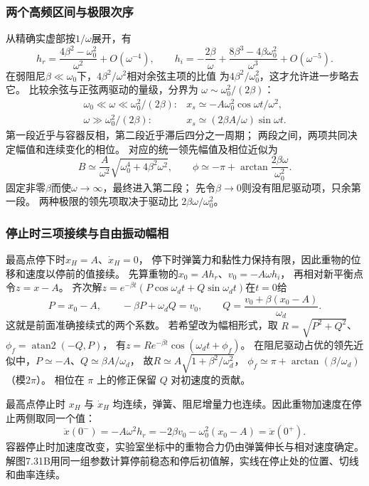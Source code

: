 \documentclass[UTF8,fontset=fandol,a4paper,11pt]{ctexart}
\begin{document}
\subsubsection*{两个高频区间与极限次序}
从精确实虚部按$1/\omega$展开，有
\[
h_r=\frac{4\beta^2-\omega_0^2}{\omega^2}+O(\omega^{-4}),\qquad
h_i=-\frac{2\beta}{\omega}
+\frac{8\beta^3-4\beta\omega_0^2}{\omega^3}+O(\omega^{-5}).
\]
在弱阻尼$\beta\ll\omega_0$下，$4\beta^2/\omega^2$相对余弦主项的比值
为$4\beta^2/\omega_0^2$，这才允许进一步略去它。
比较余弦与正弦两驱动的量级，分界为
$\omega\sim\omega_0^2/(2\beta)$：
\[
\begin{array}{ll}
\omega_0\ll\omega\ll\omega_0^2/(2\beta):&
x_s\simeq-A\omega_0^2\cos\omega t/\omega^2,\\
\omega\gg\omega_0^2/(2\beta):&
x_s\simeq(2\beta A/\omega)\sin\omega t.
\end{array}
\]
第一段近乎与容器反相，第二段近乎滞后四分之一周期；
两段之间，两项共同决定幅值和连续变化的相位。
对应的统一领先幅值及相位近似为
\[
B\simeq\frac{A}{\omega^2}\sqrt{\omega_0^4+4\beta^2\omega^2},\qquad
\phi\simeq-\pi+\arctan\frac{2\beta\omega}{\omega_0^2}.
\]
固定非零$\beta$而使$\omega\to\infty$，最终进入第二段；
先令$\beta\to0$则没有阻尼驱动项，只余第一段。
两种极限的领先项取决于驱动比 $2\beta\omega/\omega_0^2$。

\subsubsection*{停止时三项接续与自由振动幅相}
最高点停下时$x_H=A$、$\dot x_H=0$，
停下时弹簧力和黏性力保持有限，因此重物的位移和速度以停前的值接续。
先算重物的$x_0=Ah_r$、$v_0=-A\omega h_i$，
再相对新平衡点令$z=x-A$。
齐次解$z=e^{-\beta t}(P\cos\omega_dt+Q\sin\omega_dt)$在$t=0$给
\[
P=x_0-A,\qquad -\beta P+\omega_dQ=v_0,
\qquad Q=\frac{v_0+\beta(x_0-A)}{\omega_d}.
\]
这就是前面准确接续式的两个系数。
若希望改为幅相形式，取
$R=\sqrt{P^2+Q^2}$、$\phi_f=\operatorname{atan2}(-Q,P)$，
有$z=Re^{-\beta t}\cos(\omega_dt+\phi_f)$。
在阻尼驱动占优的领先近似中，$P\simeq-A$、$Q\simeq\beta A/\omega_d$，
故$R\simeq A\sqrt{1+\beta^2/\omega_d^2}$，
$\phi_f\simeq\pi+\arctan(\beta/\omega_d)$（模$2\pi$）。
相位在 $\pi$ 上的修正保留 $Q$ 对初速度的贡献。

最高点停止时 $x_H$ 与 $\dot x_H$ 均连续，弹簧、阻尼增量力也连续。因此重物加速度在停止两侧取同一个值：
\[
\ddot x(0^-)=-A\omega^2h_r
=-2\beta v_0-\omega_0^2(x_0-A)=\ddot x(0^+).
\]
容器停止时加速度改变，实验室坐标中的重物合力仍由弹簧伸长与相对速度确定。解图7.31B用同一组参数计算停前稳态和停后初值解，实线在停止处的位置、切线和曲率连续。
\end{document}
